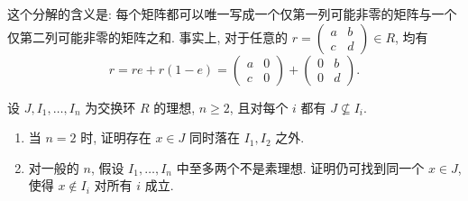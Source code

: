 \documentclass{article}
\begin{document}
\begin{solution}
	这个分解的含义是: 每个矩阵都可以唯一写成一个仅第一列可能非零的矩阵与一个仅第二列可能非零的矩阵之和. 事实上, 对于任意的 $r = \begin{pmatrix} a & b \\ c & d \end{pmatrix} \in R$, 均有
	\[ r = re + r(1-e) = \begin{pmatrix} a & 0 \\ c & 0 \end{pmatrix} + \begin{pmatrix} 0 & b \\ 0 & d \end{pmatrix}. \]
\end{solution}



\begin{problem}
设 $J,I_1,\ldots,I_n$ 为交换环 $R$ 的理想, $n\geq 2$, 且对每个 $i$ 都有 $J\nsubseteq I_i$.
\begin{enumerate}
  \item[(a)] 当 $n=2$ 时, 证明存在 $x\in J$ 同时落在 $I_1,I_2$ 之外.
  \item[(b)] 对一般的 $n$, 假设 $I_1,\ldots,I_n$ 中至多两个不是素理想. 证明仍可找到同一个 $x\in J$, 使得 $x\notin I_i$ 对所有 $i$ 成立.
\end{enumerate}
\end{problem}
\end{document}
